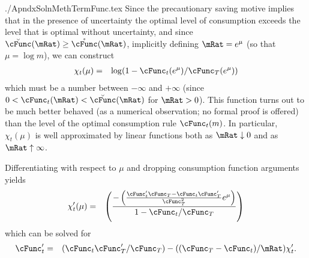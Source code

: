 \documentclass{econtex}
\begin{document}
\begin{verbatimwrite}{./ApndxSolnMethTermFunc.tex}
Since the precautionary saving motive implies that in the presence of
uncertainty the optimal level of consumption exceeds the level that is
optimal without uncertainty, and since $\breve{\cFunc}(\mRat) \geq \mathring{\cFunc}(\mRat)$, 
implicitly defining $\mRat = e^{\mu}$ (so that $\mu = \log m$), we can construct
\begin{eqnarray}
 \chi_{t}(\mu) & = & \log (1-\cFunc_{t}(e^{\mu})/\cFunc_{T}(e^{\mu}))  \label{eq:ChiDef}
\end{eqnarray}
which must be a number between $-\infty$ and $+\infty$ (since $0 < \cFunc_{t}(\mRat) < \breve{\cFunc}(\mRat)$ for $\mRat > 0$).  This function turns out to be much better behaved (as 
a numerical observation; no formal proof is offered) than the level of the optimal consumption rule $\cFunc_{t}(m)$.  In particular, $\chi_{t}(\mu)$ is well approximated by linear functions both as $\mRat \downarrow 0$ and as $\mRat \uparrow \infty$.  

Differentiating with respect to $\mu$ and dropping consumption function arguments
yields
\begin{eqnarray}
 \chi^{\prime}_{t}(\mu) & = & \left(\frac{-\left(\frac{\cFunc^{\prime}_{t}\cFunc_{T}-\cFunc_{t}\cFunc_{T}^{\prime}}{\cFunc_{T}^{2}}e^{\mu}\right)}{1-\cFunc_{t}/\cFunc_{T}}\right) \label{eq:ChiPDef}
\end{eqnarray}
which can be solved for 
\begin{eqnarray}
 \cFunc^{\prime}_{t} & = & (\cFunc_{t}\cFunc_{T}^{\prime}/\cFunc_{T})-((\cFunc_{T}-\cFunc_{t})/\mRat)\chi^{\prime}_{t} \label{eq:cFuncPFromChi}.
\end{eqnarray}


\end{verbatimwrite}
\end{document}
